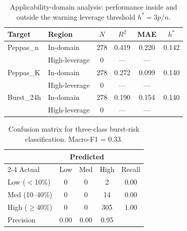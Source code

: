 
\begin{table}[ht]
\centering
\caption{Applicability-domain analysis: performance inside and outside the warning leverage threshold $h^* = 3p/n$.}
\label{tab:ad_results}
\begin{tabular}{llcccc}
\toprule
Target & Region & $N$ & $R^2$ & MAE & $h^*$ \\
\midrule
Peppas\_n & In-domain & 278 & 0.419 & 0.220 & 0.142 \\
 & High-leverage & 0 & --- & --- & \\
\midrule
Peppas\_K & In-domain & 278 & 0.272 & 0.099 & 0.140 \\
 & High-leverage & 0 & --- & --- & \\
\midrule
Burst\_24h & In-domain & 278 & 0.190 & 0.154 & 0.140 \\
 & High-leverage & 0 & --- & --- & \\
\bottomrule
\end{tabular}
\end{table}


\begin{table}[ht]
\centering
\caption{Confusion matrix for three-class burst-risk classification. Macro-F1 = 0.33.}
\label{tab:confusion_matrix}
\begin{tabular}{lccc|c}
\toprule
 & \multicolumn{3}{c}{Predicted} & \\
\cmidrule(lr){2-4}
Actual & Low & Med & High & Recall \\
\midrule
Low ($<$10\%) & 0 & 0 & 2 & 0.00 \\
Med (10--40\%) & 0 & 0 & 14 & 0.00 \\
High ($\geq$40\%) & 0 & 0 & 305 & 1.00 \\
\midrule
Precision & 0.00 & 0.00 & 0.95 & \\
\bottomrule
\end{tabular}
\end{table}